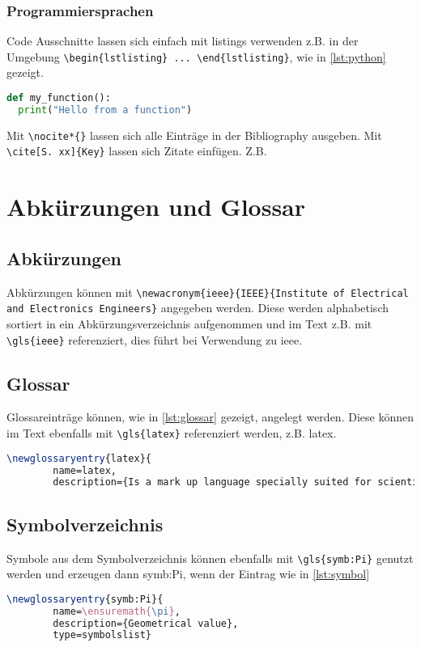 \subsubsection{Programmiersprachen}
Code Ausschnitte lassen sich einfach mit listings verwenden z.B. in der Umgebung \lstinline|\begin{lstlisting} ... \end{lstlisting}|, wie in \autoref{lst:python} gezeigt.

\begin{lstlisting}[language=Python, caption={Simple Python program}, label=lst:python]
def my_function():
  print("Hello from a function")
\end{lstlisting}


Mit \lstinline|\nocite*{}| lassen sich alle Einträge in der Bibliography ausgeben. Mit \lstinline|\cite[S. xx]{Key}| lassen sich Zitate einfügen. Z.B. \cite[S. 234]{Kurose12} \nocite*{}

\section{Abkürzungen und Glossar}
\subsection{Abkürzungen}
Abkürzungen können mit \lstinline|\newacronym{ieee}{IEEE}{Institute of Electrical and Electronics Engineers}| angegeben werden. Diese werden alphabetisch sortiert in ein Abkürzungsverzeichnis aufgenommen und im Text z.B. mit \lstinline|\gls{ieee}| referenziert, dies führt bei Verwendung zu \gls{ieee}.

\subsection{Glossar}
Glossareinträge können, wie in \autoref{lst:glossar} gezeigt, angelegt werden. Diese können im Text ebenfalls mit \lstinline|\gls{latex}| referenziert werden, z.B. \gls{latex}.
\begin{lstlisting}[caption=Glossareinträge, label=lst:glossar, language=TeX]
 \newglossaryentry{latex}{
        name=latex,
        description={Is a mark up language specially suited for scientific documents}}
\end{lstlisting}

\subsection{Symbolverzeichnis}
Symbole aus dem Symbolverzeichnis können ebenfalls mit \lstinline|\gls{symb:Pi}| genutzt werden und erzeugen dann \gls{symb:Pi}, wenn der Eintrag wie in \autoref{lst:symbol}
\begin{lstlisting}[caption=Einträge für das Symbolverzeichnis, label=lst:symbol, language=TeX]
\newglossaryentry{symb:Pi}{
        name=\ensuremath{\pi},
        description={Geometrical value},
        type=symbolslist}
\end{lstlisting}
